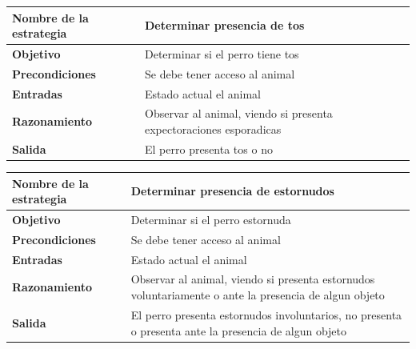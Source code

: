\documentclass[a4paper,table,xcdraw]{article}
\begin{document}
\begin{longtable}{|l|l|}
\hline
\textbf{Nombre de la estrategia} & Determinar presencia de tos                                        \\ \hline
\endhead
%
\textbf{Objetivo}                & Determinar si el perro tiene tos                                   \\ \hline
\textbf{Precondiciones}          & Se debe tener acceso al animal                                     \\ \hline
\textbf{Entradas}                & Estado actual el animal                                            \\ \hline
\textbf{Razonamiento}            & Observar al animal, viendo si presenta expectoraciones esporadicas \\ \hline
\textbf{Salida}                  & El perro presenta tos o no                                         \\ \hline
\end{longtable}

\begin{longtable}{|m{100pt}|m{300pt}|}
\hline
\textbf{Nombre de la estrategia} & Determinar presencia de estornudos                                                                    \\ \hline
\endhead
%
\textbf{Objetivo}                & Determinar si el perro estornuda                                                                      \\ \hline
\textbf{Precondiciones}          & Se debe tener acceso al animal                                                                        \\ \hline
\textbf{Entradas}                & Estado actual el animal                                                                               \\ \hline
\textbf{Razonamiento}            & Observar al animal, viendo si presenta estornudos voluntariamente o ante la presencia de algun objeto \\ \hline
\textbf{Salida}                  & El perro presenta estornudos involuntarios, no presenta o presenta ante la presencia de algun objeto  \\ \hline
\end{longtable}
\end{document}
